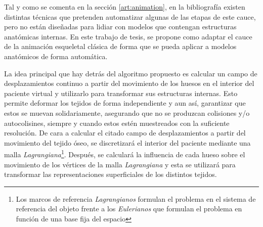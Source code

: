 Tal y como se comenta en la sección \ref{art:animation}, en la bibliografía existen distintas técnicas que pretenden automatizar algunas de las etapas de este cauce, pero no están diseñadas para lidiar con modelos que contengan estructuras anatómicas internas.  En este trabajo de tesis, se propone como adaptar el cauce de la animación esqueletal clásica de forma que se pueda aplicar a modelos anatómicos de forma automática. 

La idea principal que hay detrás del algoritmo propuesto es calcular un campo de desplazamientos continuo a partir del movimiento de los huesos
en el interior del paciente virtual y utilizarlo para transformar sus estructuras internas. Esto permite deformar los tejidos de forma independiente y\del{,} aun así, garantizar que estos se muevan solidariamente, asegurando que no se produzcan colisiones y/o autocolisines, siempre y cuando estos estén muestreados con la suficiente resolución. 
%
De cara a calcular el citado campo de desplazamientos a partir del movimiento del tejido óseo, se discretizará el interior del paciente mediante una malla \emph{Lagrangiana}\footnote{Los marcos de referencia \emph{Lagrangianos} formulan el problema en el sistema de referencia del objeto frente a los \emph{Eulerianos} que formulan el problema en función de una base fija del espacio}. Después, se calculará la influencia de cada hueso sobre el movimiento de los vértices de la malla \emph{Lagrangiana} y esta se utilizará para transformar las representaciones superficiales de los distintos tejidos. 

